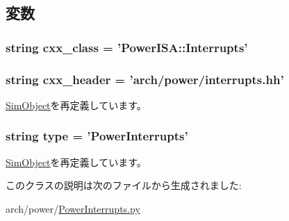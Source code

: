 \subsection{変数}
\hypertarget{classPowerInterrupts_1_1PowerInterrupts_a58cd55cd4023648e138237cfc0822ae3}{
\subsubsection[{cxx\_\-class}]{\setlength{\rightskip}{0pt plus 5cm}string {\bf cxx\_\-class} = '{\bf PowerISA::Interrupts}'}}
\label{classPowerInterrupts_1_1PowerInterrupts_a58cd55cd4023648e138237cfc0822ae3}
\hypertarget{classPowerInterrupts_1_1PowerInterrupts_a17da7064bc5c518791f0c891eff05fda}{
\subsubsection[{cxx\_\-header}]{\setlength{\rightskip}{0pt plus 5cm}string {\bf cxx\_\-header} = 'arch/power/interrupts.hh'}}
\label{classPowerInterrupts_1_1PowerInterrupts_a17da7064bc5c518791f0c891eff05fda}


\hyperlink{classm5_1_1SimObject_1_1SimObject_a17da7064bc5c518791f0c891eff05fda}{SimObject}を再定義しています。\hypertarget{classPowerInterrupts_1_1PowerInterrupts_acce15679d830831b0bbe8ebc2a60b2ca}{
\subsubsection[{type}]{\setlength{\rightskip}{0pt plus 5cm}string {\bf type} = '{\bf PowerInterrupts}'}}
\label{classPowerInterrupts_1_1PowerInterrupts_acce15679d830831b0bbe8ebc2a60b2ca}


\hyperlink{classm5_1_1SimObject_1_1SimObject_acce15679d830831b0bbe8ebc2a60b2ca}{SimObject}を再定義しています。

このクラスの説明は次のファイルから生成されました:\begin{DoxyCompactItemize}
\item 
arch/power/\hyperlink{PowerInterrupts_8py}{PowerInterrupts.py}\end{DoxyCompactItemize}
